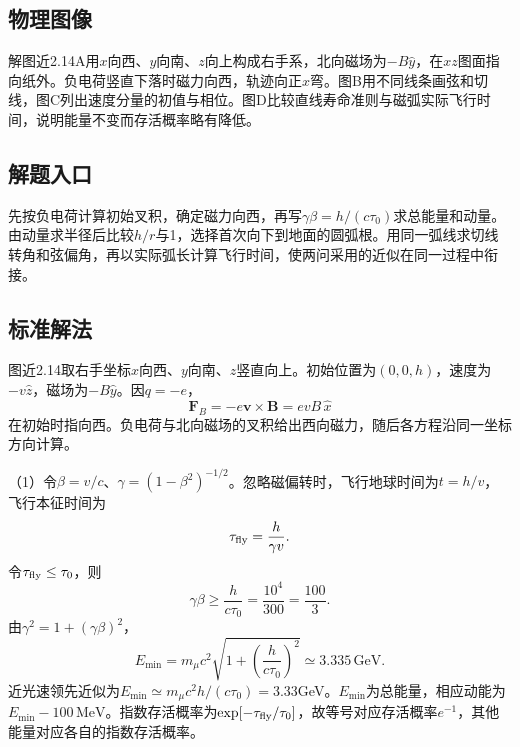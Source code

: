 \documentclass[UTF8,fontset=fandol,a4paper,11pt]{ctexart}
\begin{document}
\subsection*{物理图像}

解图近2.14A用$x$向西、$y$向南、$z$向上构成右手系，北向磁场为$-B\hat y$，在$xz$图面指向纸外。负电荷竖直下落时磁力向西，轨迹向正$x$弯。图B用不同线条画弦和切线，图C列出速度分量的初值与相位。图D比较直线寿命准则与磁弧实际飞行时间，说明能量不变而存活概率略有降低。



\subsection*{解题入口}

先按负电荷计算初始叉积，确定磁力向西，再写$\gamma\beta=h/(c\tau_0)$求总能量和动量。由动量求半径后比较$h/r$与1，选择首次向下到地面的圆弧根。用同一弧线求切线转角和弦偏角，再以实际弧长计算飞行时间，使两问采用的近似在同一过程中衔接。



\subsection*{标准解法}


图近2.14取右手坐标$x$向西、$y$向南、$z$竖直向上。初始位置为$(0,0,h)$，速度为$-v\hat z$，磁场为$-B\hat y$。因$q=-e$，
\[
\boldsymbol F_B=-e\boldsymbol v\times\boldsymbol B
=evB\,\hat x
\]
在初始时指向西。负电荷与北向磁场的叉积给出西向磁力，随后各方程沿同一坐标方向计算。

（1）令$\beta=v/c$、$\gamma=(1-\beta^2)^{-1/2}$。忽略磁偏转时，飞行地球时间为$t=h/v$，飞行本征时间为
\[
\tau_{\rm fly}=\frac h{\gamma v}.
\]
令$\tau_{\rm fly}\le\tau_0$，则
\[
\gamma\beta\ge\frac h{c\tau_0}=\frac{10^4}{300}
=\frac{100}{3}.
\]
由$\gamma^2=1+(\gamma\beta)^2$，
\[
\boxed{E_{\min}=m_\mu c^2
\sqrt{1+\left(\frac h{c\tau_0}\right)^2}
\simeq3.335\,\mathrm{GeV}}.
\]
近光速领先近似为$E_{\min}\simeq m_\mu c^2h/(c\tau_0)=3.33$GeV。$E_{\min}$为总能量，相应动能为$E_{\min}-100\,\mathrm{MeV}$。指数存活概率为$\exp[-\tau_{\rm fly}/\tau_0]$，故等号对应存活概率$e^{-1}$，其他能量对应各自的指数存活概率。
\end{document}
